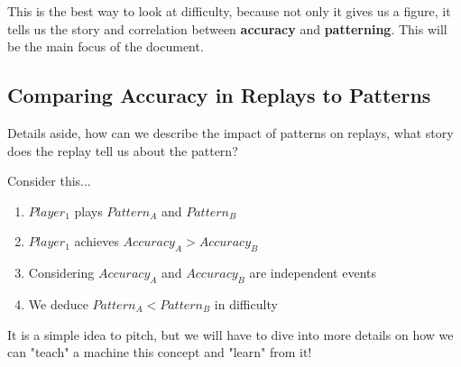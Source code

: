\documentclass{article}
\begin{document}
This is the best way to look at difficulty, because not only it gives us a figure, it tells us the story and correlation between \textbf{accuracy} and \textbf{patterning}. This will be the main focus of the document.

\subsection{Comparing Accuracy in Replays to Patterns}

Details aside, how can we describe the impact of patterns on replays, what story does the replay tell us about the pattern?

Consider this...
\begin{enumerate}
	\item $Player_1$ plays $Pattern_A$ and $Pattern_B$
	\item $Player_1$ achieves $Accuracy_A > Accuracy_B$
	\item Considering $Accuracy_A$ and $Accuracy_B$ are independent events
	\item We deduce $Pattern_A < Pattern_B$ in difficulty
\end{enumerate}

It is a simple idea to pitch, but we will have to dive into more details on how we can "teach" a machine this concept and "learn" from it!
\end{document}
